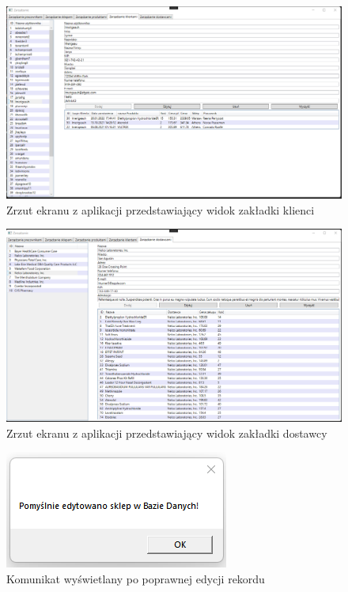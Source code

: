 \documentclass[12pt,a4paper]{article}
\begin{document}
        \begin{figure}[H]
            \centering
            \includegraphics[scale=0.4]{images/kienci.png}
            \caption{Zrzut ekranu z aplikacji przedstawiający widok zakładki klienci}
        \end{figure}
            
        \begin{figure}[H]
            \centering
            \includegraphics[scale=0.4]{images/dostawy.png}
            \caption{Zrzut ekranu z aplikacji przedstawiający widok zakładki dostawcy}
        \end{figure}
            
        \begin{figure}[H]
            \centering
            \includegraphics{images/komunikat1.png}
            \caption{Komunikat wyświetlany po poprawnej edycji rekordu}
        \end{figure}
            
\end{document}

